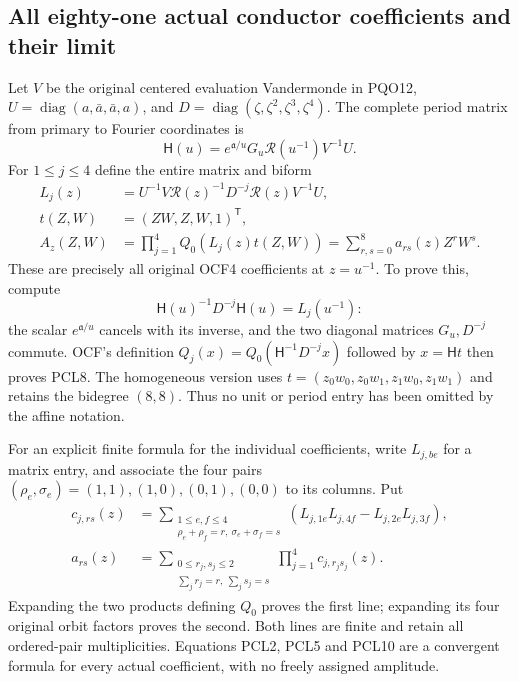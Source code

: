 \subsection{All eighty-one actual conductor coefficients and their limit}
Let $V$ be the original centered evaluation Vandermonde in PQO12,
$U=\operatorname{diag}(a,\bar a,\bar a,a)$, and
$D=\operatorname{diag}(\zeta,\zeta^2,\zeta^3,\zeta^4)$.
The complete period matrix from primary to Fourier coordinates is
\[
 \mathsf H(u)=e^{\mathfrak a/u}G_u\mathcal R(u^{-1})V^{-1}U.
 \tag{PCL7}
\]
For $1\le j\le4$ define the entire matrix and biform
\[
 \begin{split}
 L_j(z)&=U^{-1}V\mathcal R(z)^{-1}D^{-j}
                              \mathcal R(z)V^{-1}U,\\
 t(Z,W)&=(ZW,Z,W,1)^{\mathsf T},\\
 A_z(Z,W)&=\prod_{j=1}^4 Q_0(L_j(z)t(Z,W))
                  =\sum_{r,s=0}^8 a_{rs}(z)Z^rW^s.
 \end{split}\tag{PCL8}
\]
These are precisely all original OCF4 coefficients at $z=u^{-1}$.
To prove this, compute
\[
 \mathsf H(u)^{-1}D^{-j}\mathsf H(u)=L_j(u^{-1}):
 \tag{PCL9}
\]
the scalar $e^{\mathfrak a/u}$ cancels with its inverse, and the
two diagonal matrices $G_u,D^{-j}$ commute. OCF's definition
$Q_j(x)=Q_0(\mathsf H^{-1}D^{-j}x)$ followed by $x=\mathsf Ht$
then proves PCL8. The homogeneous version uses
$t=(z_0w_0,z_0w_1,z_1w_0,z_1w_1)$ and retains the bidegree
$(8,8)$. Thus no unit or period entry has been omitted by the
affine notation.

For an explicit finite formula for the individual coefficients,
write $L_{j,b e}$ for a matrix entry, and associate the four pairs
$(\rho_e,\sigma_e)=(1,1),(1,0),(0,1),(0,0)$ to its columns.
Put
\[
 \begin{split}
 c_{j,rs}(z)&=
 \sum_{\substack{1\le e,f\le4\\
       \rho_e+\rho_f=r,\ \sigma_e+\sigma_f=s}}
 (L_{j,1e}L_{j,4f}-L_{j,2e}L_{j,3f}),\\
 a_{rs}(z)&=
 \sum_{\substack{0\le r_j,s_j\le2\\
             \sum_jr_j=r,\ \sum_js_j=s}}
                       \prod_{j=1}^4c_{j,r_js_j}(z).
 \end{split}\tag{PCL10}
\]
Expanding the two products defining $Q_0$ proves the first line;
expanding its four original orbit factors proves the second.
Both lines are finite and retain all ordered-pair multiplicities.
Equations PCL2, PCL5 and PCL10 are a convergent formula for every
actual coefficient, with no freely assigned amplitude.

